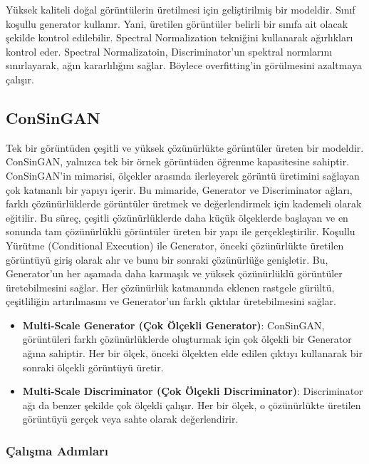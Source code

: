Yüksek kaliteli doğal görüntülerin üretilmesi için geliştirilmiş bir modeldir. Sınıf koşullu generator kullanır. Yani, üretilen görüntüler belirli bir sınıfa ait olacak şekilde kontrol edilebilir. Spectral Normalization tekniğini kullanarak ağırlıkları kontrol eder. Spectral Normalizatoin, Discriminator'un spektral normlarını sınırlayarak, ağın kararlılığını sağlar. Böylece overfitting'in görülmesini azaltmaya çalışır.

\subsection{ConSinGAN}

Tek bir görüntüden çeşitli ve yüksek çözünürlükte görüntüler üreten bir modeldir. ConSinGAN, yalnızca tek bir örnek görüntüden öğrenme kapasitesine sahiptir. ConSinGAN’in mimarisi, ölçekler arasında ilerleyerek görüntü üretimini sağlayan çok katmanlı bir yapıyı içerir. Bu mimaride, Generator ve Discriminator ağları, farklı çözünürlüklerde görüntüler üretmek ve değerlendirmek için kademeli olarak eğitilir. Bu süreç, çeşitli çözünürlüklerde daha küçük ölçeklerde başlayan ve en sonunda tam çözünürlüklü görüntüler üreten bir yapı ile gerçekleştirilir. Koşullu Yürütme (Conditional Execution) ile Generator, önceki çözünürlükte üretilen görüntüyü giriş olarak alır ve bunu bir sonraki çözünürlüğe genişletir. Bu, Generator'un her aşamada daha karmaşık ve yüksek çözünürlüklü görüntüler üretebilmesini sağlar. Her çözünürlük katmanında eklenen rastgele gürültü, çeşitliliğin artırılmasını ve Generator'un farklı çıktılar üretebilmesini sağlar.

\begin{itemize}
    \item \textbf{Multi-Scale Generator (Çok Ölçekli Generator)}: ConSinGAN, görüntüleri farklı çözünürlüklerde oluşturmak için çok ölçekli bir Generator ağına sahiptir. Her bir ölçek, önceki ölçekten elde edilen çıktıyı kullanarak bir sonraki ölçekli görüntüyü üretir.
    \item \textbf{Multi-Scale Discriminator (Çok Ölçekli Discriminator)}: Discriminator ağı da benzer şekilde çok ölçekli çalışır. Her bir ölçek, o çözünürlükte üretilen görüntüyü gerçek veya sahte olarak değerlendirir.
\end{itemize}

\subsubsection{Çalışma Adımları}

